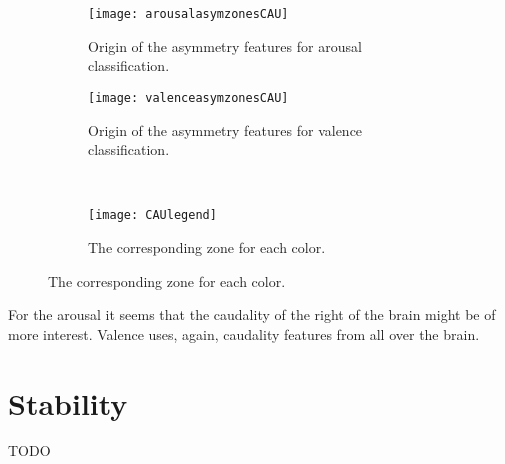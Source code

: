 \begin{figure}[H]
\centering
  \begin{subfigure}[b]{.4\textwidth}
    \texttt{[image: arousalasymzonesCAU]}
    \caption{Origin of the asymmetry features for arousal classification.\label{arousalasymzonesCAU}}
  \end{subfigure}
\hfill
  \begin{subfigure}[b]{.4\textwidth}
    \texttt{[image: valenceasymzonesCAU]}
    \caption{Origin of the asymmetry features for valence classification.\label{valenceasymzonesCAU}}
  \end{subfigure}
\\
  \begin{subfigure}[b]{.5\textwidth}
    \texttt{[image: CAUlegend]}
    \caption{The corresponding zone for each color.\label{CAUlegend}}
  \end{subfigure}
\end{figure}

For the arousal it seems that the caudality of the right of the brain might be of more interest. Valence uses, again, caudality features from all over the brain.

\section{Stability}
TODO

